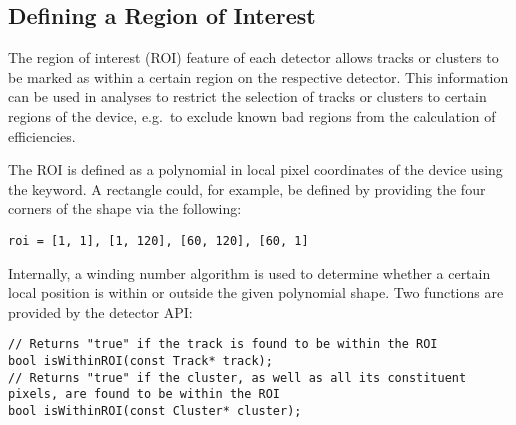 \subsection{Defining a Region of Interest}
\label{sec:roi}

The region of interest (ROI) feature of each detector allows tracks or clusters to be marked as within a certain region on the respective detector.
This information can be used in analyses to restrict the selection of tracks or clusters to certain regions of the device, e.g.\ to exclude known bad regions from the calculation of efficiencies.

The ROI is defined as a polynomial in local pixel coordinates of the device using the  keyword. A rectangle could, for example, be defined by providing the four corners of the shape via the following:

\begin{verbatim}
roi = [1, 1], [1, 120], [60, 120], [60, 1]
\end{verbatim}

Internally, a winding number algorithm is used to determine whether a certain local position is within or outside the given polynomial shape.
Two functions are provided by the detector API:

\begin{verbatim}
// Returns "true" if the track is found to be within the ROI
bool isWithinROI(const Track* track);
// Returns "true" if the cluster, as well as all its constituent pixels, are found to be within the ROI
bool isWithinROI(const Cluster* cluster);
\end{verbatim}
